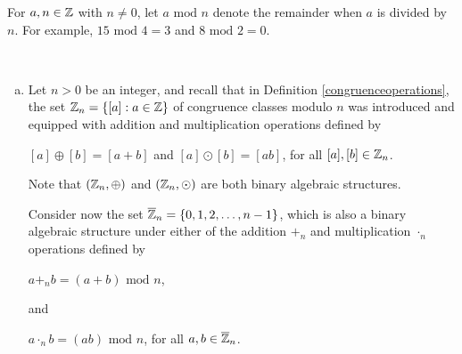 \documentclass[11pt,fleqn,dvipsnames,usenames]{article}
\newcommand{\p}{\noindent}
\begin{document}
%
\notation For $a,n\in\mathbb{Z}$ with $n\neq 0$, let $a\text{ mod }n$ denote the remainder when $a$ is divided by $n$.  For example, $15\text{ mod }4 = 3$ and $8\text{ mod }2 = 0$.
%
\begin{examples}~
\begin{enumerate}[(a)]
\item Let $n>0$ be an integer, and recall that in Definition \ref{congruenceoperations}, the set $\mathbb{Z}_{n} = \left\{[a]:a\in\mathbb{Z}\right\}$ of congruence classes modulo $n$ was introduced and equipped with addition and multiplication operations defined by
\begin{center}
$[a]\oplus [b] = [a + b]$ and $[a]\odot [b] = [ab]$, for all $[a],[b]\in\mathbb{Z}_{n}$.
\end{center}
\p Note that $(\mathbb{Z}_{n},\oplus)$ and $(\mathbb{Z}_{n},\odot)$ are both binary algebraic structures.
\vsp

\p Consider now the set $\overline{\mathbb{Z}}_{n} = \left\{0,1,2,\ldots, n-1\right\}$, which is also a binary algebraic structure under either of the addition $+_{n}$ and multiplication $\cdot_{n}$ operations defined by
\begin{center}
$a+_{n}b = (a + b)\text{ mod }n$,
\end{center}
and
\begin{center}
$a\cdot_{n}b = (ab)\text{ mod }n$, for all $a,b\in\overline{\mathbb{Z}}_{n}$.
\end{center}


\end{enumerate}
\end{examples}
\end{document}
